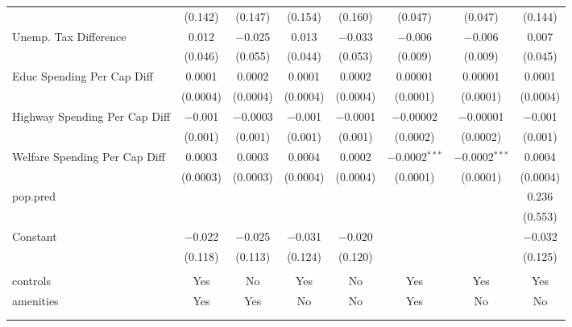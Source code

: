 \begin{table}[!htbp]
\begin{tabular}{@{\extracolsep{5pt}}lccccccc}
  & (0.142) & (0.147) & (0.154) & (0.160) & (0.047) & (0.047) & (0.144) \\ 
  Unemp. Tax Difference & 0.012 & $-$0.025 & 0.013 & $-$0.033 & $-$0.006 & $-$0.006 & 0.007 \\ 
  & (0.046) & (0.055) & (0.044) & (0.053) & (0.009) & (0.009) & (0.045) \\ 
  Educ Spending Per Cap Diff & 0.0001 & 0.0002 & 0.0001 & 0.0002 & 0.00001 & 0.00001 & 0.0001 \\ 
  & (0.0004) & (0.0004) & (0.0004) & (0.0004) & (0.0001) & (0.0001) & (0.0004) \\ 
  Highway Spending Per Cap Diff & $-$0.001 & $-$0.0003 & $-$0.001 & $-$0.0001 & $-$0.00002 & $-$0.00001 & $-$0.001 \\ 
  & (0.001) & (0.001) & (0.001) & (0.001) & (0.0002) & (0.0002) & (0.001) \\ 
  Welfare Spending Per Cap Diff & 0.0003 & 0.0003 & 0.0004 & 0.0002 & $-$0.0002$^{***}$ & $-$0.0002$^{***}$ & 0.0004 \\ 
  & (0.0003) & (0.0003) & (0.0004) & (0.0004) & (0.0001) & (0.0001) & (0.0004) \\ 
  pop.pred &  &  &  &  &  &  & 0.236 \\ 
  &  &  &  &  &  &  & (0.553) \\ 
  Constant & $-$0.022 & $-$0.025 & $-$0.031 & $-$0.020 &  &  & $-$0.032 \\ 
  & (0.118) & (0.113) & (0.124) & (0.120) &  &  & (0.125) \\ 
 \hline \\[-1.8ex] 
controls & Yes & No & Yes & No & Yes & Yes & Yes \\ 
amenities & Yes & Yes & No & No & Yes & No & No \\ 
\hline \\[-1.8ex] 
\hline 
\hline \\[-1.8ex] 
\end{tabular} 
\end{table} 

